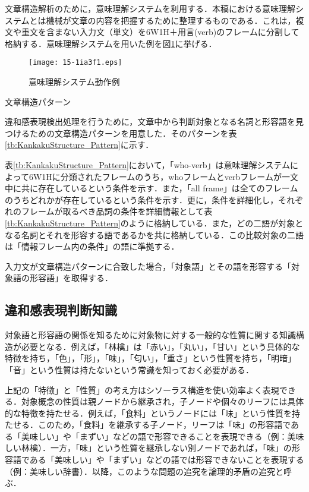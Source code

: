 \documentclass[japanese]{jnlp_1.4}
\begin{document}
文章構造解析のために，意味理解システム\cite{Shinohara2002}を利用する．本稿における意味理解システムとは機械が文章の内容を把握するために整理するものである．これは，複文や重文を含まない入力文（単文）を6W1H＋用言(verb)のフレームに分割して格納する．意味理解システムを用いた例を図\ref{fig:Imirikai}に挙げる．
\begin{figure}[t]
	\begin{center}
    \texttt{[image: 15-1ia3f1.eps]}
		\caption{意味理解システム動作例}
		\label{fig:Imirikai}
	\end{center}
\end{figure}
\begin{table}[t]
	\caption{文章構造パターン}
	\label{tb:KankakuStructure_Pattern}

\end{table}


違和感表現検出処理を行うために，文章中から判断対象となる名詞と形容語を見つけるための文章構造パターンを用意した．そのパターンを表\ref{tb:KankakuStructure_Pattern}に示す．

表\ref{tb:KankakuStructure_Pattern}において，「who-verb」は意味理解システムによって6W1Hに分類されたフレームのうち，whoフレームとverbフレームが一文中に共に存在しているという条件を示す．また，「all frame」は全てのフレームのうちどれかが存在しているという条件を示す．更に，条件を詳細化し，それぞれのフレームが取るべき品詞の条件を詳細情報として表\ref{tb:KankakuStructure_Pattern}のように格納している．また，どの二語が対象となる名詞とそれを形容する語であるかを共に格納している．この比較対象の二語は「情報フレーム内の条件」の語に準拠する．

入力文が文章構造パターンに合致した場合，「対象語」とその語を形容する「対象語の形容語」を取得する．


\subsection{違和感表現判断知識}\label{sec:iwakanknowledge}

対象語と形容語の関係を知るために対象物に対する一般的な性質に関する知識構造が必要となる．例えば，「林檎」は「赤い」，「丸い」，「甘い」という具体的な特徴を持ち，「色」，「形」，「味」，「匂い」，「重さ」という性質を持ち，「明暗」「音」という性質は持たないという常識を知っておく必要がある．

上記の「特徴」と「性質」の考え方はシソーラス構造を使い効率よく表現できる．対象概念の性質は親ノードから継承され，子ノードや個々のリーフには具体的な特徴を持たせる．例えば，「食料」というノードには「味」という性質を持たせる．このため，「食料」を継承する子ノード，リーフは「味」の形容語である「美味しい」や「まずい」などの語で形容できることを表現できる（例：美味しい林檎）．一方，「味」という性質を継承しない別ノードであれば，「味」の形容語である「美味しい」や「まずい」などの語では形容できないことを表現する（例：美味しい辞書）．以降，このような問題の追究を論理的矛盾の追究と呼ぶ．
\end{document}
